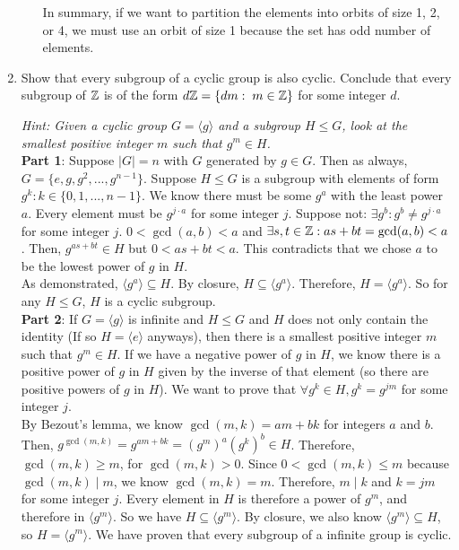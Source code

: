 \documentclass{amsart}
\begin{document}
\begin{enumerate}
\begin{enumerate}
    In summary, if we want to partition the elements into orbits of size 1, 2, or 4, we must use an orbit of size 1 because the set has odd number of elements.
\end{enumerate}

\vspace{0.2in}

\item Show that every subgroup of a cyclic group is also cyclic. Conclude that every subgroup of $\mathbb{Z}$ is of the form $d\mathbb{Z} = \{dm:\;m\in\mathbb{Z}\}$ for some integer $d$.

\emph{Hint: Given a cyclic group $G = \langle g\rangle$ and a subgroup $H\leq G$, look at the smallest positive integer $m$ such that $g^m\in H$.}\\

\textbf{Part 1}: Suppose $|G|=n$ with $G$ generated by $g\in G$. Then as always, $G=\{e,g,g^2,...,g^{n-1}\}$. Suppose $H\leq G$ is a subgroup with elements of form $g^k:k\in\{0,1,...,n-1\}$. We know there must be some $g^a$ with the least power $a$. Every element must be $g^{j\cdot a}$ for some integer $j$. Suppose not: $\exists g^b:g^b\neq g^{j\cdot a}$ for some integer $j$. $0<\gcd(a,b)<a$ and $\exists s,t\in\mathbb{Z}:as+bt=\gcd(a,b)<a$. Then, $g^{as+bt}\in H$ but $0<as+bt<a$. This contradicts that we chose $a$ to be the lowest power of $g$ in $H$.\\

As demonstrated, $\langle g^a\rangle\subseteq H$. By closure, $H\subseteq\langle g^a\rangle$. Therefore, $H=\langle g^a\rangle$. So for any $H\leq G$, $H$ is a cyclic subgroup.\\

\textbf{Part 2}: If $G=\langle g\rangle$ is infinite and $H\leq G$ and $H$ does not only contain the identity (If so $H=\langle e\rangle$ anyways), then there is a smallest positive integer $m$ such that $g^m\in H$. If we have a negative power of $g$ in $H$, we know there is a positive power of $g$ in $H$ given by the inverse of that element (so there are positive powers of $g$ in $H$). We want to prove that $\forall g^k\in H,g^k=g^{jm}$ for some integer $j$.\\

By Bezout's lemma, we know $\gcd(m,k)=am+bk$ for integers $a$ and $b$. Then, $g^{\gcd(m,k)}=g^{am+bk}=(g^m)^a(g^k)^b\in H$. Therefore, $\gcd(m,k)\geq m$, for $\gcd(m,k)>0$. Since $0<\gcd(m,k)\leq m$ because $\gcd(m,k)\mid m$, we know $\gcd(m,k)=m$. Therefore, $m\mid k$ and $k=jm$ for some integer $j$.  Every element in $H$ is therefore a power of $g^m$, and therefore in $\langle g^m\rangle$. So we have $H\subseteq\langle g^m\rangle$. By closure, we also know $\langle g^m\rangle\subseteq H$, so $H=\langle g^m\rangle$. We have proven that every subgroup of a infinite group is cyclic.\\


\end{enumerate}
\end{document}
